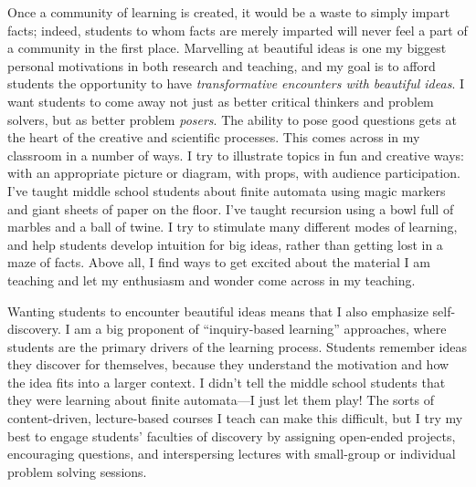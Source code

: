 \documentclass[12pt]{article}
\begin{document}
Once a community of learning is created, it would be a waste to simply
impart facts; indeed, students to whom facts are merely imparted will
never feel a part of a community in the first place. Marvelling at
beautiful ideas is one my biggest personal motivations in both
research and teaching, and my goal is to afford students the
opportunity to have \emph{transformative encounters with beautiful
  ideas}.  I want students to come away not just as better critical
thinkers and problem solvers, but as better problem \emph{posers}.
The ability to pose good questions gets at the heart of the creative
and scientific processes. This comes across in my classroom in a
number of ways.  I try to illustrate topics in fun and creative ways:
with an appropriate picture or diagram, with props, with audience
participation.  I've taught middle school students about finite
automata using magic markers and giant sheets of paper on the floor.
I've taught recursion using a bowl full of marbles and a ball of
twine.  I try to stimulate many different modes of learning, and help
students develop intuition for big ideas, rather than getting lost in
a maze of facts.  Above all, I find ways to get excited about the
material I am teaching and let my enthusiasm and wonder come across in
my teaching.

Wanting students to encounter beautiful ideas means that I also
emphasize self-discovery. I am a big proponent of ``inquiry-based
learning'' approaches, where students are the primary drivers of the
learning process. Students remember ideas they discover for
themselves, because they understand the motivation and how the idea
fits into a larger context. I didn't tell the middle school students
that they were learning about finite automata---I just let them play!
The sorts of content-driven, lecture-based courses I teach can make
this difficult, but I try my best to engage students' faculties of
discovery by assigning open-ended projects, encouraging questions, and
interspersing lectures with small-group or individual problem solving
sessions.


\end{document}

